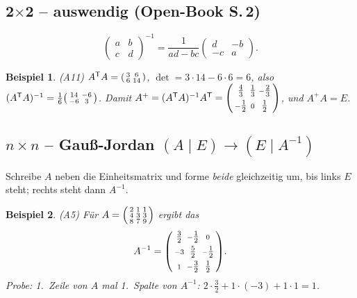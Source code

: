 \documentclass[a4paper,11pt]{article}
\newenvironment{psmallmatrix}{\left(\begin{smallmatrix}}{\end{smallmatrix}\right)}
\newcommand{\transp}{^{\mathsf{T}}}
\theoremstyle{def0}
\newtheorem*{bsp}{Beispiel}
\begin{document}
\subsection{2$\times$2 -- auswendig (Open-Book S.\,2)}
\[
\begin{pmatrix}a&b\\c&d\end{pmatrix}^{-1}
=\frac{1}{ad-bc}\begin{pmatrix}d&-b\\-c&a\end{pmatrix}.
\]
\begin{bsp}(A11) $A\transp A=\begin{psmallmatrix}3&6\\6&14\end{psmallmatrix}$,
$\det=3\cdot14-6\cdot6=6$, also
$(A\transp A)^{-1}=\tfrac16\begin{psmallmatrix}14&-6\\-6&3\end{psmallmatrix}$.
Damit $A^{+}=(A\transp A)^{-1}A\transp
=\begin{psmallmatrix}\tfrac43&\tfrac13&-\tfrac23\\[2pt]-\tfrac12&0&\tfrac12\end{psmallmatrix}$,
und $A^{+}A=E$.\end{bsp}

\subsection{$n\times n$ -- Gauß-Jordan $(A\mid E)\to(E\mid A^{-1})$}
Schreibe $A$ neben die Einheitsmatrix und forme \emph{beide} gleichzeitig um, bis links
$E$ steht; rechts steht dann $A^{-1}$.
\begin{bsp}(A5) Für $A=\begin{psmallmatrix}2&1&1\\4&3&3\\8&7&9\end{psmallmatrix}$ ergibt das
\[
A^{-1}=\begin{psmallmatrix}\tfrac32&-\tfrac12&0\\[2pt]-3&\tfrac52&-\tfrac12\\[2pt]1&-\tfrac32&\tfrac12\end{psmallmatrix}.
\]
Probe: 1.\ Zeile von $A$ mal 1.\ Spalte von $A^{-1}$: $2\cdot\tfrac32+1\cdot(-3)+1\cdot1=1$.~\checkmark
\end{bsp}
\end{document}
